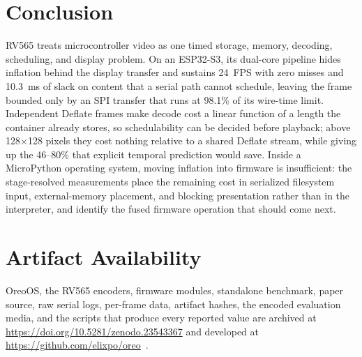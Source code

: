 \documentclass[11pt,twocolumn]{article}
\newcommand{\system}{RV565}
\newcommand{\artifactdoi}{10.5281/zenodo.23543367}
\begin{document}
\section{Conclusion}

\system{} treats microcontroller video as one timed storage, memory,
decoding, scheduling, and display problem.  On an ESP32-S3, its dual-core
pipeline hides inflation behind the display transfer and sustains 24~FPS with
zero misses and 10.3~ms of slack on content that a serial path cannot
schedule, leaving the frame bounded only by an SPI transfer that runs at
98.1\% of its wire-time limit.  Independent Deflate frames make decode cost a
linear function of a length the container already stores, so schedulability
can be decided before playback; above 128$\times$128 pixels they cost nothing
relative to a shared Deflate stream, while giving up the 46--80\% that
explicit temporal prediction would save.  Inside a MicroPython operating
system, moving inflation into firmware is insufficient: the stage-resolved
measurements place the remaining cost in serialized filesystem input,
external-memory placement, and blocking presentation rather than in the
interpreter, and identify the fused firmware operation that should come next.

\section*{Artifact Availability}

OreoOS, the \system{} encoders, firmware modules, standalone benchmark, paper
source, raw serial logs, per-frame data, artifact hashes, the encoded
evaluation media, and the scripts that produce every reported value are
archived at \url{https://doi.org/\artifactdoi} and developed at
\url{https://github.com/elixpo/oreo}~\cite{bhattacharya2026oreo}.

\begingroup
\fontsize{7pt}{7.4pt}\selectfont


\endgroup
\end{document}
